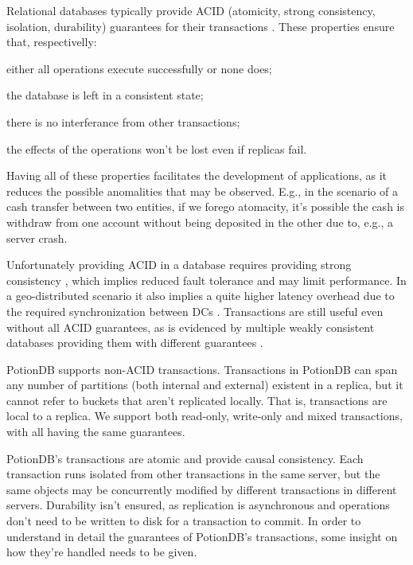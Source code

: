 \documentclass{vldb}
\begin{document}
Relational databases typically provide ACID (atomicity, strong consistency, isolation, durability) guarantees for their transactions \cite{???}.
These properties ensure that, respectivelly:
\begin{enumerate*}[label=(\roman*)]
	\item either all operations execute successfully or none does;
	\item the database is left in a consistent state;
	\item there is no interferance from other transactions;
	\item the effects of the operations won't be lost even if replicas fail.
\end{enumerate*}
Having all of these properties facilitates the development of applications, as it reduces the possible anomalities that may be observed.
E.g., in the scenario of a cash transfer between two entities, if we forego atomacity, it's possible the cash is withdraw from one account without being deposited in the other due to, e.g., a server crash.

Unfortunately providing ACID in a database requires providing strong consistency \cite{???}
, which implies reduced fault tolerance and may limit performance.
In a geo-distributed scenario it also implies a quite higher latency overhead due to the required synchronization between DCs \cite{???}.
Transactions are still useful even without all ACID guarantees, as is evidenced by multiple weakly consistent databases providing them with different guarantees \cite{???}.

PotionDB supports non-ACID transactions.
Transactions in PotionDB can span any number of partitions (both internal and external) existent in a replica, but it cannot refer to buckets that aren't replicated locally.
That is, transactions are local to a replica.
We support both read-only, write-only and mixed transactions, with all having the same guarantees.

PotionDB's transactions are atomic and provide causal consistency.
Each transaction runs isolated from other transactions in the same server, but the same objects may be concurrently modified by different transactions in different servers.
Durability isn't ensured, as replication is asynchronous and operations don't need to be written to disk for a transaction to commit.
In order to understand in detail the guarantees of PotionDB's transactions, some insight on how they're handled needs to be given.
\end{document}

